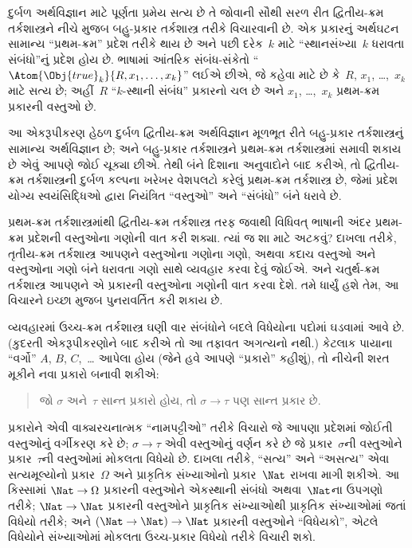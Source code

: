 દુર્બળ અર્થવિજ્ઞાન માટે પૂર્ણતા પ્રમેય સત્ય છે તે જોવાની સૌથી સરળ રીત
દ્વિતીય-ક્રમ તર્કશાસ્ત્રને નીચે મુજબ બહુ-પ્રકાર તર્કશાસ્ત્ર તરીકે
વિચારવાની છે. એક પ્રકારનું અર્થઘટન સામાન્ય ``પ્રથમ-ક્રમ'' પ્રદેશ
તરીકે થાય છે અને પછી દરેક~$k$ માટે ``સ્થાનસંખ્યા~$k$ ધરાવતા સંબંધો''નું
પ્રદેશ હોય છે. ભાષામાં આંતરિક સંબંધ-સંકેતો
``$\Atom{\Obj{true}_k}{R,x_1,\dots,x_k}$'' લઈએ છીએ, જે કહેવા માટે છે
કે~$R$, $x_1$, \dots,~$x_k$ માટે સત્ય છે; અહીં~$R$ ``$k$-સ્થાની
સંબંધ'' પ્રકારનો ચલ છે અને $x_1$, \dots,~$x_k$ પ્રથમ-ક્રમ પ્રકારની
વસ્તુઓ છે.

આ એકરૂપીકરણ હેઠળ દુર્બળ દ્વિતીય-ક્રમ અર્થવિજ્ઞાન મૂળભૂત રીતે બહુ-પ્રકાર
તર્કશાસ્ત્રનું સામાન્ય અર્થવિજ્ઞાન છે; અને બહુ-પ્રકાર તર્કશાસ્ત્રને
પ્રથમ-ક્રમ તર્કશાસ્ત્રમાં સમાવી શકાય છે એવું આપણે જોઈ ચૂક્યા છીએ. તેથી
બંને દિશાના અનુવાદોને બાદ કરીએ, તો દ્વિતીય-ક્રમ તર્કશાસ્ત્રની દુર્બળ
કલ્પના ખરેખર વેશપલટો કરેલું પ્રથમ-ક્રમ તર્કશાસ્ત્ર છે, જેમાં પ્રદેશ
યોગ્ય સ્વયંસિદ્ધિઓ દ્વારા નિયંત્રિત ``વસ્તુઓ'' અને ``સંબંધો'' બંને ધરાવે
છે.
\endgroup


\begingroup
\makeatletter{}\makeatother


\label{guunit:OLP-0178}


પ્રથમ-ક્રમ તર્કશાસ્ત્રમાંથી દ્વિતીય-ક્રમ તર્કશાસ્ત્ર તરફ જવાથી વિધિવત્
ભાષાની અંદર પ્રથમ-ક્રમ પ્રદેશની વસ્તુઓના ગણોની વાત કરી શક્યા.
ત્યાં જ શા માટે અટકવું? દાખલા તરીકે, તૃતીય-ક્રમ તર્કશાસ્ત્ર આપણને
વસ્તુઓના ગણોના ગણો, અથવા કદાચ વસ્તુઓ અને વસ્તુઓના ગણો બંને ધરાવતા ગણો
સાથે વ્યવહાર કરવા દેવું જોઈએ. અને ચતુર્થ-ક્રમ તર્કશાસ્ત્ર આપણને એ
પ્રકારની વસ્તુઓના ગણોની વાત કરવા દેશે. તમે ધાર્યું હશે તેમ, આ વિચારને
ઇચ્છા મુજબ પુનરાવર્તિત કરી શકાય છે.

વ્યવહારમાં ઉચ્ચ-ક્રમ તર્કશાસ્ત્ર ઘણી વાર સંબંધોને બદલે વિધેયોના પદોમાં
ઘડવામાં આવે છે. (કુદરતી એકરૂપીકરણોને બાદ કરીએ તો આ
તફાવત અગત્યનો નથી.) કેટલાક પાયાના ``વર્ગો'' $A$, $B$, $C$,~\dots
આપેલા હોય (જેને હવે આપણે ``પ્રકારો'' કહીશું), તો નીચેની શરત મૂકીને
નવા પ્રકારો બનાવી શકીએ:
\begin{quote}
જો $\sigma$ અને~$\tau$ સાન્ત પ્રકારો હોય, તો $\sigma \to \tau$ પણ
સાન્ત પ્રકાર છે.
\end{quote}
પ્રકારોને એવી વાક્યરચનાત્મક ``નામપટ્ટીઓ'' તરીકે વિચારો જે આપણા
પ્રદેશમાં જોઈતી વસ્તુઓનું વર્ગીકરણ કરે છે; $\sigma \to \tau$ એવી
વસ્તુઓનું વર્ણન કરે છે જે પ્રકાર~$\sigma$ની વસ્તુઓને પ્રકાર~$\tau$ની
વસ્તુઓમાં મોકલતા વિધેયો છે. દાખલા તરીકે, ``સત્ય'' અને ``અસત્ય'' એવા
સત્યમૂલ્યોનો પ્રકાર~$\Omega$ અને પ્રાકૃતિક સંખ્યાઓનો પ્રકાર~$\Nat$
રાખવા માગી શકીએ. આ કિસ્સામાં $\Nat \to \Omega$ પ્રકારની વસ્તુઓને
એકસ્થાની સંબંધો અથવા~$\Nat$ના ઉપગણો તરીકે; $\Nat \to \Nat$ પ્રકારની
વસ્તુઓને પ્રાકૃતિક સંખ્યાઓથી પ્રાકૃતિક સંખ્યાઓમાં જતાં વિધેયો તરીકે;
અને $(\Nat \to \Nat) \to \Nat$ પ્રકારની વસ્તુઓને ``વિધેયકો'', એટલે
વિધેયોને સંખ્યાઓમાં મોકલતા ઉચ્ચ-પ્રકાર વિધેયો તરીકે વિચારી શકો.

